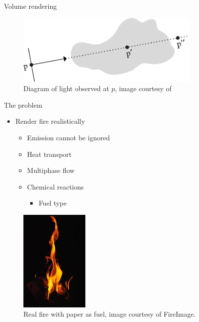 \documentclass{beamer}
\begin{document}
\begin{frame}{Volume rendering}

\begin{figure}[b!]
\includegraphics[width=0.8\textwidth]{img/ray_marching}
\caption*{\tiny{Diagram of light observed at $p$, image courtesy of~\cite{Pharr:2004}}}
\end{figure}

\end{frame}

\begin{frame}{The problem}

\begin{multicols}{2}

\begin{itemize}
\setlength\itemsep{0.5em}
\item Render fire realistically 
		\begin{itemize}
		\setlength\itemsep{0.5em}
		\item Emission cannot be ignored
		\item Heat transport
		\item Multiphase flow
		\item Chemical reactions
			\vspace{-0.5cm} %
			\begin{itemize}
			\item Fuel type
			\end{itemize}
		\end{itemize}
\end{itemize}

\begin{figure}[t!]
\begin{center}
\includegraphics[width=0.3\textwidth]{img/real_fire1} 
\caption*{\tiny{Real fire with paper as fuel, image courtesy of FireImage\footnotemark[2].}}
\end{center}
\end{figure}
\end{multicols}

\end{frame}
\end{document}
